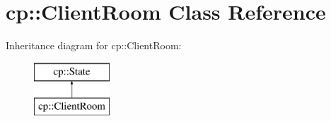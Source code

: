 \hypertarget{classcp_1_1_client_room}{}\section{cp\+:\+:Client\+Room Class Reference}
\label{classcp_1_1_client_room}
Inheritance diagram for cp\+:\+:Client\+Room\+:\begin{figure}[H]
\begin{center}
\leavevmode
\includegraphics[height=2.000000cm]{classcp_1_1_client_room}
\end{center}
\end{figure}
